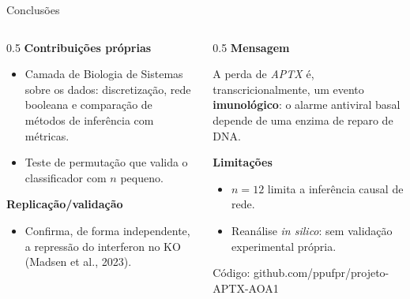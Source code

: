 \documentclass[aspectratio=169,11pt]{beamer}
\newcommand{\gene}[1]{\textit{#1}}
\begin{document}
\begin{frame}{Conclusões}
  \begin{columns}[T]
    \begin{column}{0.5\textwidth}
      \textbf{\textcolor{aptxgreen}{Contribuições próprias}}
      \begin{itemize}\small
        \item Camada de Biologia de Sistemas sobre os dados: discretização, rede booleana e comparação de métodos de inferência com métricas.
        \item Teste de permutação que valida o classificador com $n$ pequeno.
      \end{itemize}
      \textbf{\textcolor{aptxblue}{Replicação/validação}}
      \begin{itemize}\small
        \item Confirma, de forma independente, a repressão do interferon no KO (Madsen et al., 2023).
      \end{itemize}
    \end{column}
    \begin{column}{0.5\textwidth}
      \textbf{Mensagem}
      \begin{block}{}
        \small A perda de \gene{APTX} é, transcricionalmente, um evento \textbf{imunológico}: o alarme antiviral basal depende de uma enzima de reparo de DNA.
      \end{block}
      \textbf{Limitações}
      \begin{itemize}\small
        \item $n=12$ limita a inferência causal de rede.
        \item Reanálise \emph{in silico}: sem validação experimental própria.
      \end{itemize}
      \vspace{0.4em}
      \centering\footnotesize\textcolor{aptxblue}{Código: github.com/ppufpr/projeto-APTX-AOA1}
    \end{column}
  \end{columns}
\end{frame}
\end{document}
